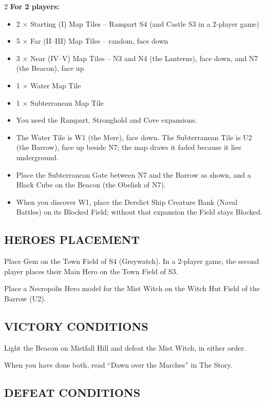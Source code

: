 \begin{multicols*}{2}
\textbf{For 2 players:}
\begin{itemize}
  \item 2 × Starting (I) Map Tiles -- Rampart S4 (and Castle S3 in a 2-player game)
  \item 5 × Far (II--III) Map Tiles -- random, face down
  \item 3 × Near (IV--V) Map Tiles -- N3 and N4 (the Lanterns), face down, and N7 (the Beacon), face up
  \item 1 × Water Map Tile
  \item 1 × Subterranean Map Tile
\end{itemize}

\begin{itemize}
  \item You need the Rampart, Stronghold and Cove expansions.
  \item The Water Tile is W1 (the Mere), face down. The Subterranean Tile is U2 (the Barrow), face up beside N7; the map draws it faded because it lies underground.
  \item Place the Subterranean Gate between N7 and the Barrow as shown, and a Black Cube on the Beacon (the Obelisk of N7).
  \item When you discover W1, place the Derelict Ship Creature Bank (Naval Battles) on its Blocked Field; without that expansion the Field stays Blocked.
\end{itemize}

\subsection*{\MakeUppercase{Heroes Placement}}

Place Gem on the Town Field of S4 (Greywatch). In a 2-player game, the second player places their Main Hero on the Town Field of S3.

Place a Necropolis Hero model for the Mist Witch on the Witch Hut Field of the Barrow (U2).

\subsection*{\MakeUppercase{Victory Conditions}}

Light the Beacon on Mistfall Hill and defeat the Mist Witch, in either order.

When you have done both, read ``Dawn over the Marches'' in The Story.

\subsection*{\MakeUppercase{Defeat Conditions}}


\end{multicols*}
